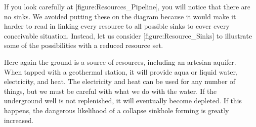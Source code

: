 If you look carefully at [figure:Resources_Pipeline], you will notice that there are no sinks. We avoided putting these on the diagram because it would make it harder to read in linking every resource to all possible sinks to cover every conceivable situation. Instead, let us consider [figure:Resource_Sinks] to illustrate some of the possibilities with a reduced resource set.

    {}

Here again the ground is a source of resources, including an artesian aquifer. When tapped with a geothermal station, it will provide aqua or liquid water, electricity, and heat. The electricity and heat can be used for any number of things, but we must be careful with what we do with the water. If the underground well is not replenished, it will eventually become depleted. If this happens, the dangerous likelihood of a collapse sinkhole forming is greatly increased.

